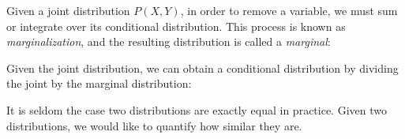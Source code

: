 \documentclass[11pt]{article}
\begin{document}
\begin{prooftree}
\end{prooftree}

%
%

\noindent Given a joint distribution $P(X, Y)$, in order to remove a variable, we must sum or integrate over its conditional distribution. This process is known as \textit{marginalization}, and the resulting distribution is called a \textit{marginal}:

\begin{prooftree}
\end{prooftree}

\noindent Given the joint distribution, we can obtain a conditional distribution by dividing the joint by the marginal distribution:

\begin{prooftree}
\end{prooftree}



    \noindent It is seldom the case two distributions are exactly equal in practice. Given two distributions, we would like to quantify how similar they are.
\end{document}
